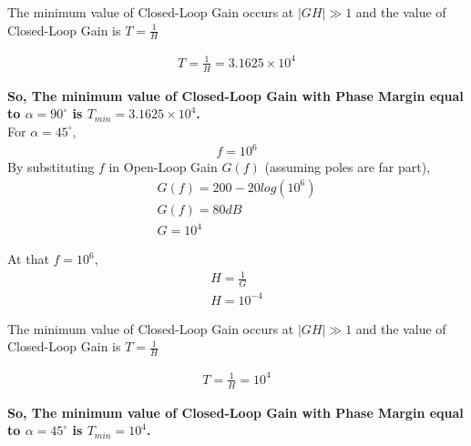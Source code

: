 \begin{enumerate}[label=\thesubsection.\arabic*.,ref=\thesubsection.\theenumi]
The minimum value of Closed-Loop Gain occurs at $|GH| \gg 1$ and the value of Closed-Loop Gain is $T=\frac{1}{H}$

\begin{align}
T = \frac{1}{H} = 3.1625 \times 10^{4}
\end{align}

\textbf{So, The minimum value of Closed-Loop Gain with Phase Margin equal to $\alpha=90^{\circ}$ is $T_{min} = 3.1625 \times 10^{4}$.}\\

For $\alpha=45^{\circ}$,
\begin{align}
f=10^{6}
\end{align}
By substituting $f$ in Open-Loop Gain $G(f)$ (assuming poles are far part), 
\begin{align}
G(f) = 200 - 20log(10^{6})\\
G(f) = 80 dB \\
G = 10^{4}
\end{align}

At that $f = 10^{6}$, 
\begin{align}
H = \frac{1}{G}\\
H = 10^{-4}
\end{align}

The minimum value of Closed-Loop Gain occurs at $|GH| \gg 1$ and the value of Closed-Loop Gain is $T=\frac{1}{H}$

\begin{align}
T = \frac{1}{H} = 10^{4}
\end{align}

\textbf{So, The minimum value of Closed-Loop Gain with Phase Margin equal to $\alpha=45^{\circ}$ is $T_{min} = 10^{4}$.}


\end{enumerate}

